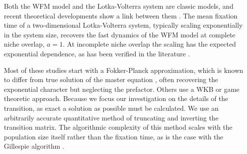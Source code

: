 \documentclass[a4paper,10pt]{article}
\numberwithin{equation}{section} %
\begin{document}
Both the WFM model and the Lotka-Volterra system are classic models, and recent theoretical developments show a link between them \cite{Antal2006,Lin2012,Constable2015}. 
The mean fixation time of a two-dimensional Lotka-Volterra system, typically scaling exponentially in the system size, recovers the fast dynamics of the WFM model at complete niche overlap, $a=1$. 
At incomplete niche overlap the scaling has the expected exponential dependence, as has been verified in the literature \cite{Fisher2014,Chotibut2015,Dobrinevski2012}. 
\iffalse
Specifically, Gabel and Meerson \cite{Gabel2013} regard a model similar to the one considered in this paper, near the independent case of complete niche mismatch. 
Chotibut and Nelson \cite{Chotibut2015} look both at this limit and near the full niche overlap of $a=1$, calculating the mean time to fixation near both limits, though they do not explore the transition between the extremes. 
Dobrinevski and Frey \cite{Dobrinevski2012} have also recognized the distinction between the exponential times of a stable fixed point and the polynomial times of a neutrally stable system; they too do not investigate the transition between them. 
One work that \emph{does} examine the transition is that of Fisher and Mehta \cite{Fisher2014}; %
however, they use a different model, and are interested in community-level metrics like abundance distributions rather than the fixation time that we use to determine whether or not two species will coexist. 
\fi
Most of these studies \cite{Chotibut2015,Dobrinevski2012,Fisher2014,Constable2015,Lin2012} start with a Fokker-Planck approximation, which is known to differ from true solution of the master equation \cite{Doering2005,Ovaskainen2010}, often  recovering the exponential character but neglecting the prefactor. 
Others use a WKB \cite{Gabel2013} or game theoretic \cite{Antal2006} approach. 
Because we focus our investigation on the details of the transition, as exact a solution as possible must be calculated. 
We use an arbitrarily accurate quantitative method of truncating and inverting the transition matrix. 
The algorithmic complexity of this method scales with the population size itself rather than the fixation time, as is the case with the Gillespie algorithm \cite{Gillespie1977}. 
\end{document}
